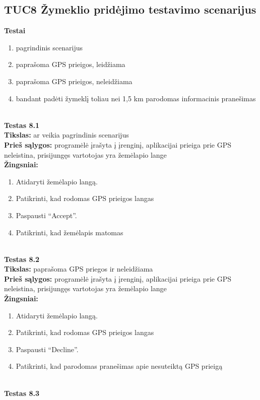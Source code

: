 \documentclass{VUMIFPSkursinis}
\begin{document}
	\subsection{TUC8 Žymeklio pridėjimo testavimo scenarijus}
		\textbf{Testai}
		\begin{enumerate}[noitemsep,topsep=0pt]
			\item pagrindinis scenarijus
			\item paprašoma GPS prieigos, leidžiama
			\item paprašoma GPS prieigos, neleidžiama
			\item bandant padėti žymeklį toliau nei 1,5 km parodomas informacinis pranešimas
		\end{enumerate}
		\textbf{}\\
		\textbf{Testas 8.1}\\
		\textbf{Tikslas:} ar veikia pagrindinis scenarijus\\
		\textbf{Prieš sąlygos:} programėlė įrašyta į įrenginį, aplikacijai prieiga prie GPS neleistina, prisijungęs vartotojas yra žemėlapio lange\\
		\textbf{Žingsniai:}
		\begin{enumerate}[noitemsep,topsep=0pt]
			\item Atidaryti žemėlapio langą.
			\item Patikrinti, kad rodomas GPS prieigos langas
			\item Paspausti “Accept”.
			\item Patikrinti, kad žemėlapis matomas
		\end{enumerate}
		\textbf{}\\
		\textbf{Testas 8.2}\\
		\textbf{Tikslas:} paprašoma GPS priegos ir neleidžiama\\
		\textbf{Prieš sąlygos:} programėlė įrašyta į įrenginį, aplikacijai prieiga prie GPS neleistina, prisijungęs vartotojas yra žemėlapio lange\\
		\textbf{Žingsniai:}
		\begin{enumerate}[noitemsep,topsep=0pt]
			\item Atidaryti žemėlapio langą.
			\item Patikrinti, kad rodomas GPS prieigos langas
			\item Paspausti “Decline”.
			\item Patikrinti, kad parodomas pranešimas apie nesuteiktą GPS prieigą
		\end{enumerate}
		\textbf{}\\
		\textbf{Testas 8.3}\\
\end{document}
